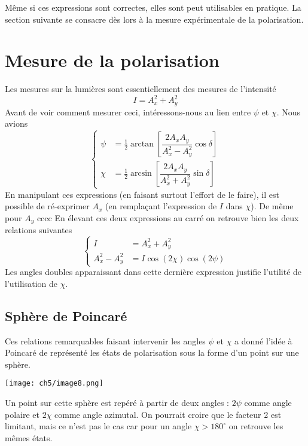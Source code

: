 	Même si ces expressions sont correctes, elles sont peut utilisables en pratique. La section 
	suivante se consacre dès lors à la mesure expérimentale de la polarisation.
	
	\newpage
\section{Mesure de la polarisation}
Les mesures sur la lumières sont essentiellement des mesures de l'intensité
\begin{equation}
I = A_x^2+A_y^2
\end{equation}
Avant de voir comment mesurer ceci, intéressons-nous au lien entre $\psi$ et $\chi$. Nous avions
\begin{equation}
\left\{\begin{array}{ll}
\psi &= \frac{1}{2}\arctan\left[\dfrac{2A_xA_y}{A_x^2-A_y^2}\cos\delta\right]\\
\chi &= \frac{1}{2}\arcsin\left[\dfrac{2A_xA_y}{A_x^2+A_y^2}\sin\delta\right]	
\end{array}\right.
\end{equation}
En manipulant ces expressions (en faisant surtout l'effort de le faire), il est possible de 
ré-exprimer $A_x$ (en remplaçant l'expression de $I$ dans $\chi$). De même pour $A_y$
cccc
En élevant ces deux expressions au carré on retrouve bien les deux relations suivantes 
\begin{equation}
\left\{\begin{array}{ll}
I &= A_x^2+A_y^2\\
A_x^2-A_y^2 &= I\cos(2\chi)\cos(2\psi)
\end{array}\right.
\end{equation}
Les angles doubles apparaissant dans cette dernière expression justifie l'utilité de 
l'utilisation de $\chi$.

	\subsection{Sphère de Poincaré}
	Ces relations remarquables faisant intervenir les angles $\psi$ et $\chi$ a donné l'idée à 
	Poincaré de représenté les états de polarisation sous la forme d'un point sur une sphère. 
	
	\begin{center}
	\texttt{[image: ch5/image8.png]}
	\end{center}
	
	Un point sur cette sphère est repéré à partir de deux angles : $2\psi$ comme angle polaire et 
	$2\chi$ comme angle azimutal. On pourrait croire que le facteur 2 est limitant, mais ce n'est 
	pas le cas car pour un angle $\chi>180^\circ$ on retrouve les mêmes états.\\
	
